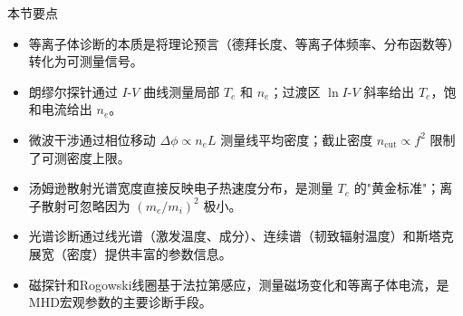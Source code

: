 \begin{review}{本节要点}{}{}
\begin{itemize}
    \item 等离子体诊断的本质是将理论预言（德拜长度、等离子体频率、分布函数等）转化为可测量信号。
    \item 朗缪尔探针通过 $I$-$V$ 曲线测量局部 $T_e$ 和 $n_e$；过渡区 $\ln I$-$V$ 斜率给出 $T_e$，饱和电流给出 $n_e$。
    \item 微波干涉通过相位移动 $\Delta\phi \propto n_e L$ 测量线平均密度；截止密度 $n_{\mathrm{cut}} \propto f^2$ 限制了可测密度上限。
    \item 汤姆逊散射光谱宽度直接反映电子热速度分布，是测量 $T_e$ 的"黄金标准"；离子散射可忽略因为 $(m_e/m_i)^2$ 极小。
    \item 光谱诊断通过线光谱（激发温度、成分）、连续谱（韧致辐射温度）和斯塔克展宽（密度）提供丰富的参数信息。
    \item 磁探针和Rogowski线圈基于法拉第感应，测量磁场变化和等离子体电流，是MHD宏观参数的主要诊断手段。
\end{itemize}
\end{review}

